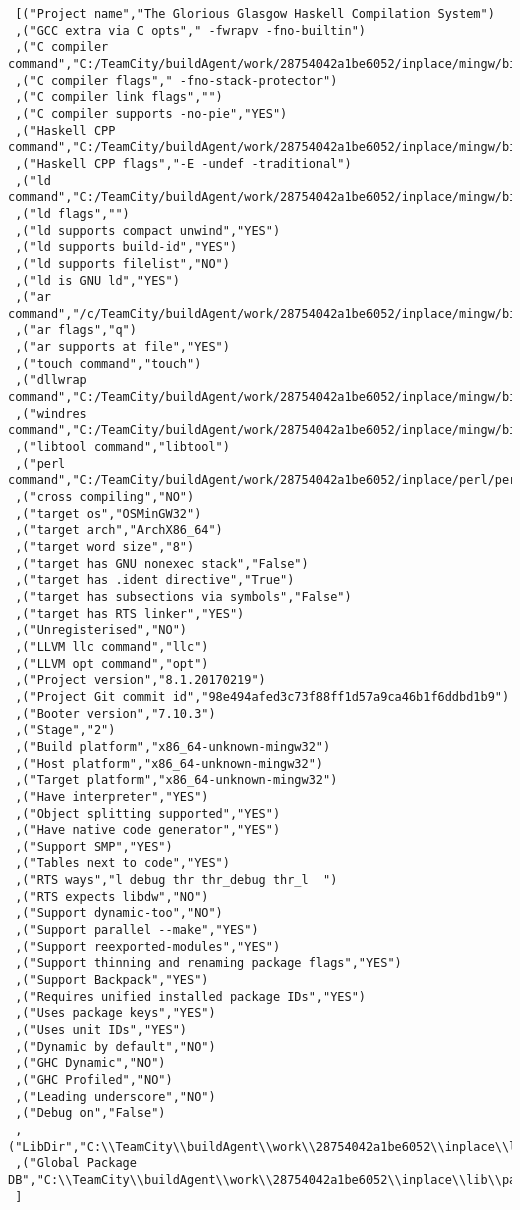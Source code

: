 \begin{verbatim}
 [("Project name","The Glorious Glasgow Haskell Compilation System")
 ,("GCC extra via C opts"," -fwrapv -fno-builtin")
 ,("C compiler command","C:/TeamCity/buildAgent/work/28754042a1be6052/inplace/mingw/bin/gcc.exe")
 ,("C compiler flags"," -fno-stack-protector")
 ,("C compiler link flags","")
 ,("C compiler supports -no-pie","YES")
 ,("Haskell CPP command","C:/TeamCity/buildAgent/work/28754042a1be6052/inplace/mingw/bin/gcc.exe")
 ,("Haskell CPP flags","-E -undef -traditional")
 ,("ld command","C:/TeamCity/buildAgent/work/28754042a1be6052/inplace/mingw/bin/ld.exe")
 ,("ld flags","")
 ,("ld supports compact unwind","YES")
 ,("ld supports build-id","YES")
 ,("ld supports filelist","NO")
 ,("ld is GNU ld","YES")
 ,("ar command","/c/TeamCity/buildAgent/work/28754042a1be6052/inplace/mingw/bin/ar")
 ,("ar flags","q")
 ,("ar supports at file","YES")
 ,("touch command","touch")
 ,("dllwrap command","C:/TeamCity/buildAgent/work/28754042a1be6052/inplace/mingw/bin/dllwrap.exe")
 ,("windres command","C:/TeamCity/buildAgent/work/28754042a1be6052/inplace/mingw/bin/windres.exe")
 ,("libtool command","libtool")
 ,("perl command","C:/TeamCity/buildAgent/work/28754042a1be6052/inplace/perl/perl")
 ,("cross compiling","NO")
 ,("target os","OSMinGW32")
 ,("target arch","ArchX86_64")
 ,("target word size","8")
 ,("target has GNU nonexec stack","False")
 ,("target has .ident directive","True")
 ,("target has subsections via symbols","False")
 ,("target has RTS linker","YES")
 ,("Unregisterised","NO")
 ,("LLVM llc command","llc")
 ,("LLVM opt command","opt")
 ,("Project version","8.1.20170219")
 ,("Project Git commit id","98e494afed3c73f88ff1d57a9ca46b1f6ddbd1b9")
 ,("Booter version","7.10.3")
 ,("Stage","2")
 ,("Build platform","x86_64-unknown-mingw32")
 ,("Host platform","x86_64-unknown-mingw32")
 ,("Target platform","x86_64-unknown-mingw32")
 ,("Have interpreter","YES")
 ,("Object splitting supported","YES")
 ,("Have native code generator","YES")
 ,("Support SMP","YES")
 ,("Tables next to code","YES")
 ,("RTS ways","l debug thr thr_debug thr_l  ")
 ,("RTS expects libdw","NO")
 ,("Support dynamic-too","NO")
 ,("Support parallel --make","YES")
 ,("Support reexported-modules","YES")
 ,("Support thinning and renaming package flags","YES")
 ,("Support Backpack","YES")
 ,("Requires unified installed package IDs","YES")
 ,("Uses package keys","YES")
 ,("Uses unit IDs","YES")
 ,("Dynamic by default","NO")
 ,("GHC Dynamic","NO")
 ,("GHC Profiled","NO")
 ,("Leading underscore","NO")
 ,("Debug on","False")
 ,("LibDir","C:\\TeamCity\\buildAgent\\work\\28754042a1be6052\\inplace\\lib")
 ,("Global Package DB","C:\\TeamCity\\buildAgent\\work\\28754042a1be6052\\inplace\\lib\\package.conf.d")
 ]
\end{verbatim}
